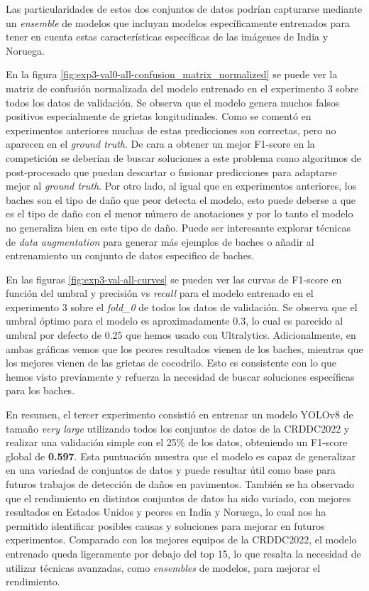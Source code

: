 Las particularidades de estos dos conjuntos de datos podrían capturarse mediante un \textit{ensemble} de modelos que incluyan modelos específicamente entrenados para tener en cuenta estas características específicas de las imágenes de India y Noruega.

En la figura \ref{fig:exp3-val0-all-confusion_matrix_normalized} se puede ver la matriz de confusión normalizada del modelo entrenado en el experimento 3 sobre todos los datos de validación. Se observa que el modelo genera muchos falsos positivos especialmente de grietas longitudinales. Como se comentó en experimentos anteriores muchas de estas predicciones son correctas, pero no aparecen en el \textit{ground truth}. De cara a obtener un mejor F1-score en la competición se deberían de buscar soluciones a este problema como algoritmos de post-procesado que puedan descartar o fusionar predicciones para adaptarse mejor al \textit{ground truth}. Por otro lado, al igual que en experimentos anteriores, los baches son el tipo de daño que peor detecta el modelo, esto puede deberse a que es el tipo de daño con el menor número de anotaciones y por lo tanto el modelo no generaliza bien en este tipo de daño. Puede ser interesante explorar técnicas de \textit{data augmentation} para generar más ejemplos de baches o añadir al entrenamiento un conjunto de datos especifico de baches.

En las figuras \ref{fig:exp3-val-all-curves} se pueden ver las curvas de F1-score en función del umbral y precisión vs \textit{recall} para el modelo entrenado en el experimento 3 sobre el \textit{fold\_0} de todos los datos de validación. Se observa que el umbral óptimo para el modelo es aproximadamente 0.3, lo cual es parecido al umbral por defecto de 0.25 que hemos usado con Ultralytics. Adicionalmente, en ambas gráficas vemos que los peores resultados vienen de los baches, mientras que los mejores vienen de las grietas de cocodrilo. Esto es consistente con lo que hemos visto previamente y refuerza la necesidad de buscar soluciones específicas para los baches.

En resumen, el tercer experimento consistió en entrenar un modelo YOLOv8 de tamaño \textit{very large} utilizando todos los conjuntos de datos de la CRDDC2022 y realizar una validación simple con el 25\% de los datos, obteniendo un F1-score global de \textbf{0.597}. Esta puntuación muestra que el modelo es capaz de generalizar en una variedad de conjuntos de datos y puede resultar útil como base para futuros trabajos de detección de daños en pavimentos. También se ha observado que el rendimiento en distintos conjuntos de datos ha sido variado, con mejores resultados en Estados Unidos y peores en India y Noruega, lo cual nos ha permitido identificar posibles causas y soluciones para mejorar en futuros experimentos. Comparado con los mejores equipos de la CRDDC2022, el modelo entrenado queda ligeramente por debajo del top 15, lo que resalta la necesidad de utilizar técnicas avanzadas, como \textit{ensembles} de modelos, para mejorar el rendimiento.

